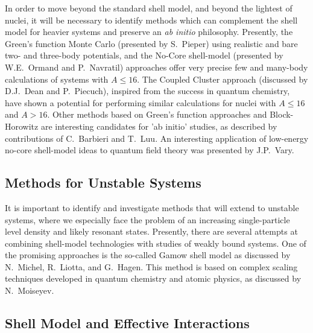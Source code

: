 \documentclass[12pt]{iopart}
\begin{document}
In order to move beyond the standard shell model, and beyond the
lightest of nuclei, it will be necessary to
identify methods which can complement the shell model for heavier 
systems and preserve an {\it ab initio} philosophy. Presently, 
the Green's function Monte Carlo (presented by S.~Pieper) using realistic
and bare two- and three-body potentials, 
and the No-Core shell-model (presented by W.E.~Ormand and P.~Navratil)
approaches offer very precise few and many-body 
calculations of systems with 
$A\le 16$.  The Coupled Cluster approach (discussed 
by D.J.~Dean and P.~Piecuch), inspired 
from the success in quantum chemistry, have shown a 
potential for performing similar calculations
for nuclei with $A\le 16$ and $A> 16$. 
Other methods based on Green's function approaches and 
Block-Horowitz are interesting candidates for 'ab initio' studies, as
described by contributions of C.~Barbieri and T.~Luu. An interesting
application of low-energy no-core shell-model ideas to quantum 
field theory was presented by J.P.~Vary.

\subsection{Methods for Unstable Systems} 

It is important to identify and investigate 
methods that will extend to unstable 
systems, where we especially face the problem of an 
increasing single-particle 
level density and likely resonant states.
Presently, there are several attempts at  
combining shell-model 
technologies with  studies of weakly bound systems. 
One of the promising approaches is 
the so-called Gamow shell model as discussed
by N.~Michel, R.~Liotta, and G.~Hagen. This method
is based on complex scaling techniques 
developed in quantum chemistry and atomic physics, 
as discussed by N.~Moiseyev. 

\subsection{Shell Model and Effective Interactions} 
\end{document}
